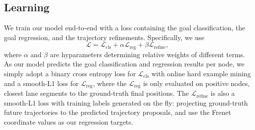 \subsection{Learning}
\label{sec:learning}
We train our model end-to-end with a loss containing the goal classification, the goal
regression, and the trajectory refinements. Specifically, we use
$$
\label{eq:objective}
\mathcal{L} = \mathcal{L}_{\text{cls}} + \alpha\mathcal{L}_{\text{reg}} +
\beta\mathcal{L}_{\text{refine}},
$$
where $\alpha$ and $\beta$ are hyparameters determining relative weights of
different terms. As our model predicts the goal classification and regression results per node, we simply adopt a binary cross entropy loss for $\mathcal{L}_{\text{cls}}$ with online hard example mining \cite{ohem} and a smooth-L1 loss for $\mathcal{L}_{\text{reg}}$, where
the $\mathcal{L}_{\text{reg}}$ is only evaluated on positive nodes, \ie closest lane
segments to the ground-truth final positions. The $\mathcal{L}_{\text{refine}}$ is also
a smooth-L1 loss with training labels generated on the fly: projecting
ground-truth future trajectories to the predicted trajectory proposals, and use
the Frenet coordinate values as our regression targets.




























